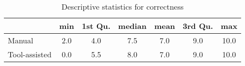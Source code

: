 \begin{table}
\caption{Descriptive statistics for correctness}
\label{tbl:correctness-overall}
\centering    
\begin{threeparttable}
\begin{tabular}{lcccccc}

& \textbf{min} & \textbf{1st Qu.} 
& \textbf{median} & \textbf{mean}
& \textbf{3rd Qu.} & \textbf{max}
\\ 
\hline

Manual & 2.0 &    4.0   &  7.5   &  7.0   &  9.0   & 10.0
\\

Tool-assisted  &  0.0  & 5.5 &  8.0 &  7.0 &  9.0 & 10.0
\\


\hline

\end{tabular}
\end{threeparttable}
\end{table}
